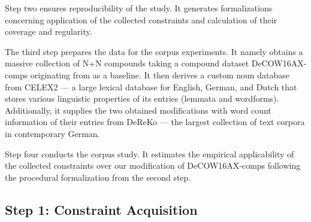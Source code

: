 \documentclass[10pt, a4paper]{article}
\begin{document}
Step two ensures reproducibility of the study. It generates formalizations concerning application of the collected constraints and calculation of their coverage and regularity.     

The third step prepares the data for the corpus experiments. It namely obtains a massive collection of N+N compounds taking a compound dataset DeCOW16AX-comps originating from  as a baseline. It then derives a custom noun database from CELEX2  --- a large lexical database for English, German, and Dutch that stores various linguistic properties of its entries (lemmata and wordforms). Additionally, it supplies the two obtained modifications with word count information of their entries from DeReKo  --- the largest collection of text corpora in contemporary German.

Step four conducts the corpus study. It estimates the empirical applicability of the collected constraints over our modification of DeCOW16AX-comps following the procedural formalization from the second step.




\subsection{Step 1: Constraint Acquisition}
\label{sec:constrget}
\end{document}
